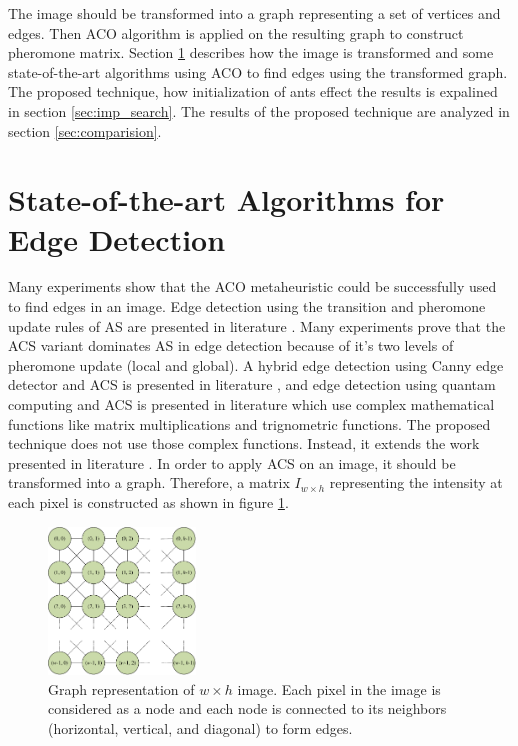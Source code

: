 \documentclass{llncs}
\begin{document}
	The image should be transformed into a graph representing a set of vertices and edges. Then ACO algorithm is applied on the resulting graph to construct pheromone matrix. Section \ref{sec:soa_edge_detection} describes how the image is transformed and some state-of-the-art algorithms using ACO to find edges using the transformed graph. The proposed technique, how initialization of ants effect the results is expalined in section \ref{sec:imp_search}. The results of the proposed technique are analyzed in section \ref{sec:comparision}.
	
	\section{State-of-the-art Algorithms for Edge Detection} \label{sec:soa_edge_detection}
	Many experiments show that the ACO metaheuristic could be successfully used to find edges in an image. Edge detection using the transition and pheromone update rules of AS are presented in literature \cite{Alirezae:2008}. Many experiments prove that the ACS variant dominates AS in edge detection \cite{Anna:2010,Agarwal:2012,Jian:2012} because of it's two levels of pheromone update (local and global). A hybrid edge detection using Canny edge detector and ACS is presented in literature \cite{Manish:2013}, and edge  detection using quantam computing and ACS is presented in literature \cite{Jian:2012} which use complex mathematical functions like matrix multiplications and trignometric functions. The proposed technique does not use those complex functions. Instead, it extends the work presented in literature \cite{Anna:2010}. In order to apply ACS on an image, it should be transformed into a graph. Therefore, a matrix $I_{w\times h}$ representing the intensity at each pixel is constructed as shown in figure \ref{fig:ImageGraph}.
	
	\begin{figure}
		\centering
		\includegraphics[width=0.35\textwidth]{IMG/GraphImage}
		\caption{Graph representation of $w\times h$ image. Each pixel in the image is considered as a node and each node is connected to its neighbors (horizontal, vertical, and diagonal) to form edges. \cite{Anna:2010}}
		\label{fig:ImageGraph}
	\end{figure}
	
\end{document}
